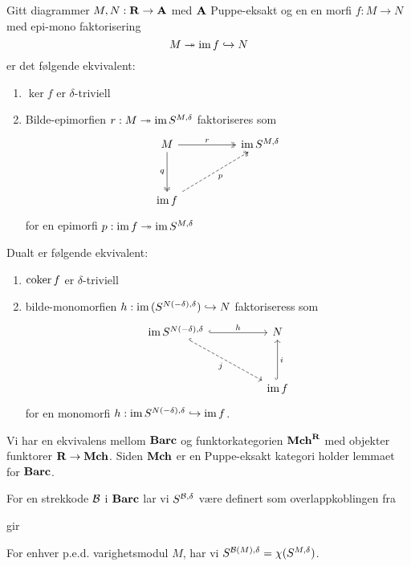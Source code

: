 \begin{lemma}\label{lem:triv_puppe-eksakt}
  Gitt diagrammer $M,N:\textnormal{\textbf{{R}}}\to\textnormal{\textbf{{A}}}$ med $\textnormal{\textbf{{A}}}$
  Puppe-eksakt og en en morfi $f: M\to N$ med epi-mono
  faktorisering
  \[M\twoheadrightarrow\textnormal{im}\, f\hookrightarrow N\]
  er det følgende ekvivalent:
  \begin{enumerate}
    \item $\ker f$ er $\delta$-triviell
    \item Bilde-epimorfien $r: M\twoheadrightarrow\textnormal{im}\, S^{M,\delta}$
      faktoriseres som
      \[\begin{tikzcd}
	M && {\im S^{M,\delta}} \\
	\\
	{\im f}
	\arrow["r", two heads, from=1-1, to=1-3]
	\arrow["q"', two heads, from=1-1, to=3-1]
	\arrow["p"', dashed, two heads, from=3-1, to=1-3]
\end{tikzcd}\]
      for en epimorfi $p: \textnormal{im}\, f\twoheadrightarrow\textnormal{im}\, S^{M,\delta}$
  \end{enumerate}
  Dualt er følgende ekvivalent:
  \begin{enumerate}
    \item $\textnormal{coker}\, f$ er $\delta$-triviell
    \item bilde-monomorfien
      $h:\textnormal{im}\,(S^{N(-\delta),\delta})\hookrightarrow N$
      faktoriseress som 
      \[\begin{tikzcd}
	{\im S^{N(-\delta),\delta}} && N \\
	\\
	&& {\im f}
	\arrow["h", hook, from=1-1, to=1-3]
	\arrow["j"', dashed, hook, from=1-1, to=3-3]
	\arrow["i"', hook, from=3-3, to=1-3]
\end{tikzcd}\]
  for en monomorfi $h:\textnormal{im}\, S^{N(-\delta),\delta}\hookrightarrow\textnormal{im}\,
      f$.
  \end{enumerate}
\end{lemma}


Vi har en ekvivalens mellom $\textnormal{\textbf{Barc}}$ og funktorkategorien
$\textnormal{\textbf{Mch}}^{\textnormal{\textbf{{R}}}}$ med objekter funktorer $\textnormal{\textbf{{R}}}\to\textnormal{\textbf{Mch}}$. Siden
$\textnormal{\textbf{Mch}}$ er en Puppe-eksakt kategori holder lemmaet for
$\textnormal{\textbf{Barc}}$.

For en strekkode $\mathcal{B}$ i $\textnormal{\textbf{Barc}}$ lar vi
$S^{\mathcal{B},\delta}$ være definert som overlappkoblingen fra

\citep[Lemma 3.5]{Bauer2020} gir

\begin{lemma}\label{lem:Lem3.5}
  For enhver p.e.d. varighetsmodul $M$, har vi
  $S^{\mathcal{B}(M),\delta} = \chi(S^{M,\delta})$.
\end{lemma}

